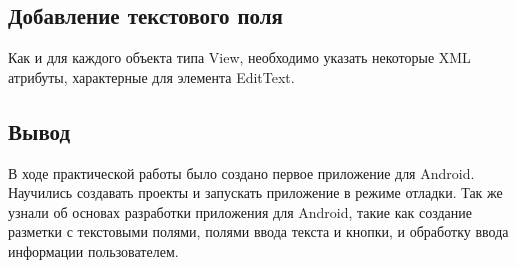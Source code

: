 \subsection{Добавление текстового поля}
Как и для каждого объекта типа View, необходимо указать некоторые XML атрибуты, характерные для элемента EditText.

\newpage

\subsection*{Вывод}
В ходе практической работы было создано первое приложение для Android. Научились создавать проекты и запускать приложение в режиме отладки. Так же узнали об основах разработки приложения для Android, такие как создание разметки с текстовыми полями, полями ввода текста и кнопки, и обработку ввода информации пользователем.

